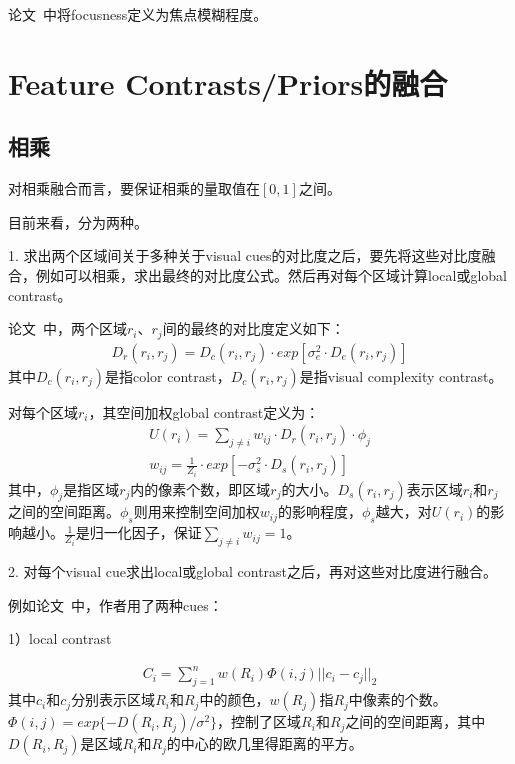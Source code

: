 \documentclass[12pt]{article}
\begin{document}
论文~\cite{jiangpeng2013salient}中将focusness定义为焦点模糊程度。

\section{Feature Contrasts/Priors的融合}

\subsection{相乘}

对相乘融合而言，要保证相乘的量取值在$[0, 1]$之间。

目前来看，分为两种。

1. 求出两个区域间关于多种关于visual cues的对比度之后，要先将这些对比度融合，例如可以相乘，求出最终的对比度公式。然后再对每个区域计算local或global contrast。

论文~\cite{zhu2014tag}中，两个区域$r_i$、$r_j$间的最终的对比度定义如下：
\begin{align}
D_r(r_i, r_j) = D_c(r_i, r_j) \cdot exp[\sigma_e^2 \cdot D_e(r_i, r_j)]
\end{align}
其中$D_c(r_i, r_j)$是指color contrast，$D_c(r_i, r_j)$是指visual complexity contrast。

对每个区域$r_i$，其空间加权global contrast定义为：
\begin{align}
U(r_i) = \sum_{j\ne i}w_{ij} \cdot D_r(r_i, r_j) \cdot \phi_j\\
w_{ij} = \frac{1}{Z_i}\cdot exp[-\sigma_s^2 \cdot D_s(r_i, r_j)]
\end{align}
其中，$\phi_j$是指区域$r_j$内的像素个数，即区域$r_j$的大小。$D_s(r_i, r_j)$表示区域$r_i$和$r_j$之间的空间距离。$\phi_s$则用来控制空间加权$w_{ij}$的影响程度，$\phi_s$越大，对$U(r_i)$的影响越小。$\frac{1}{Z_i}$是归一化因子，保证$\sum_{j \ne i}w_{ij} = 1$。

2. 对每个visual cue求出local或global contrast之后，再对这些对比度进行融合。

例如论文~\cite{yan2013hierarchical}中，作者用了两种cues：

1）local contrast

\begin{align}
C_i = \sum_{j=1}^{n}w(R_i)\Phi(i, j)||c_i-c_j||_2
\end{align}
其中$c_i$和$c_j$分别表示区域$R_i$和$R_j$中的颜色，$w(R_j)$指$R_j$中像素的个数。$\Phi(i, j) = exp\{-D(R_i, R_j)/\sigma^2\}$，控制了区域$R_i$和$R_j$之间的空间距离，其中$D(R_i, R_j)$是区域$R_i$和$R_j$的中心的欧几里得距离的平方。
\end{document}
